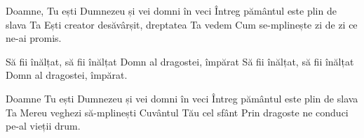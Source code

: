 
\beginverse
Doamne, Tu ești Dumnezeu și vei domni în veci
Întreg pământul este plin de slava Ta
Ești creator desăvârșit, dreptatea Ta vedem
Cum se-mplinește zi de zi ce ne-ai promis.
\endverse

\beginchorus
Să fii înălțat, să fii înălțat
Domn al dragostei, împărat
Să fii înălțat, să fii înălțat
Domn al dragostei, împărat.
\endchorus

\beginverse
Doamne Tu ești Dumnezeu și vei domni în veci
Întreg pământul este plin de slava Ta
Mereu veghezi să-mplinești Cuvântul Tău cel sfânt
Prin dragoste ne conduci pe-al vieții drum.
\endverse

\endsong